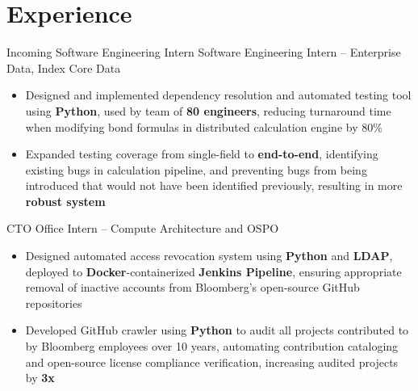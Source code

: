 \documentclass[letterpaper,11pt]{article}
\begin{document}
\section{Experience}
{Incoming Software Engineering Intern}{}
{Software Engineering Intern -- Enterprise Data, Index Core Data}{}
\begin{itemize}
  \item Designed and implemented dependency resolution and automated testing
        tool using \textbf{Python}, used by team of \textbf{80 engineers},
        reducing turnaround time when modifying bond formulas in distributed
        calculation engine by 80\%
  \item Expanded testing coverage from single-field to \textbf{end-to-end}, identifying
        existing bugs in calculation pipeline, and preventing bugs from being
        introduced that would not have been identified previously, resulting in
        more \textbf{robust system}
\end{itemize}
{CTO Office Intern -- Compute Architecture and OSPO}{}
\begin{itemize}
  \item Designed automated access revocation system using \textbf{Python} and
        \textbf{LDAP}, deployed to \textbf{Docker}-containerized
        \textbf{Jenkins Pipeline}, ensuring appropriate removal of inactive
        accounts from Bloomberg's open-source GitHub repositories
  \item Developed GitHub crawler using \textbf{Python} to audit all projects
        contributed to by Bloomberg employees over 10 years, automating
        contribution cataloging and open-source license compliance
        verification, increasing audited projects by \textbf{3x}
\end{itemize}
\end{document}
